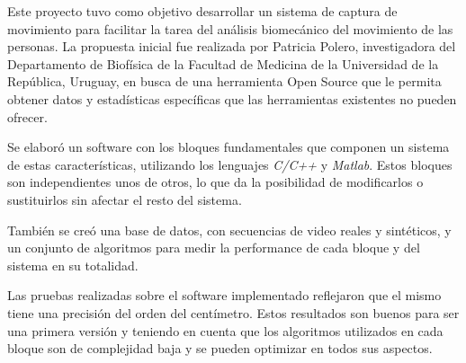 Este proyecto tuvo como objetivo desarrollar un sistema de captura de movimiento para facilitar la tarea del análisis biomecánico del movimiento de las personas. La propuesta inicial fue realizada por Patricia Polero, investigadora del Departamento de Biofísica de la Facultad de Medicina de la Universidad de la República, Uruguay, en busca de una herramienta Open Source que le permita obtener datos y estadísticas específicas que las herramientas existentes no pueden ofrecer.

\vspace{3 mm}

Se elaboró un software con los bloques fundamentales que componen un sistema de estas características, utilizando los lenguajes \emph{C/C++} y \emph{Matlab}. Estos bloques son independientes unos de otros, lo que da la posibilidad de modificarlos o sustituirlos sin afectar el resto del sistema.

\vspace{3 mm}

También se creó una base de datos, con secuencias de video reales y sintéticos, y un conjunto de algoritmos para medir la performance de cada bloque y del sistema en su totalidad.

\vspace{3 mm}

Las pruebas realizadas sobre el software implementado reflejaron que el mismo tiene una precisión del orden del centímetro. Estos resultados son buenos para ser una primera versión y teniendo en cuenta que los algoritmos utilizados en cada bloque son de complejidad baja y se pueden optimizar en todos sus aspectos.
